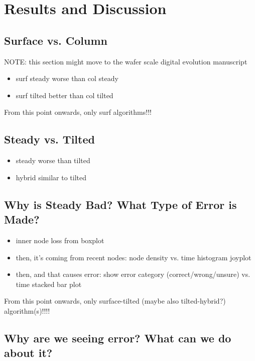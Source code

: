 \section{Results and Discussion} \label{sec:results}

\subsection{Surface vs. Column} \label{sec:surface-vs-column}
NOTE: this section might move to the wafer scale digital evolution manuscript

\begin{itemize}
    \item surf steady worse than col steady
    \item surf tilted better than col tilted
\end{itemize}

From this point onwards, only surf algorithms!!!

\subsection{Steady vs. Tilted} \label{sec:steady-vs-tilted}
\begin{itemize}
    \item steady worse than tilted
    \item hybrid similar to tilted
\end{itemize}



\subsection{Why is Steady Bad? What Type of Error is Made?} \label{sec:error-analysis}
\begin{itemize}
    \item inner node loss from boxplot
    \item then, it's coming from recent nodes: node density vs. time histogram joyplot
    \item then, and that causes error: show error category (correct/wrong/unsure) vs. time stacked bar plot
\end{itemize}

From this point onwards, only surface-tilted (maybe also tilted-hybrid?) algorithm(s)!!!!

\subsection{Why are we seeing error? What can we do about it?} \label{sec:error-uncertainty}

